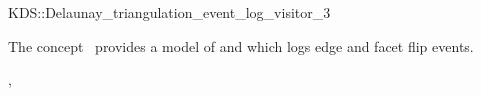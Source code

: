 

\begin{ccRefClass}{KDS::Delaunay_triangulation_event_log_visitor_3}


\ccDefinition
  
The concept \ccRefName\ provides a model of
 and  which logs edge and facet flip events.

\ccIsModel

, 

\ccSeeAlso



\end{ccRefClass}


